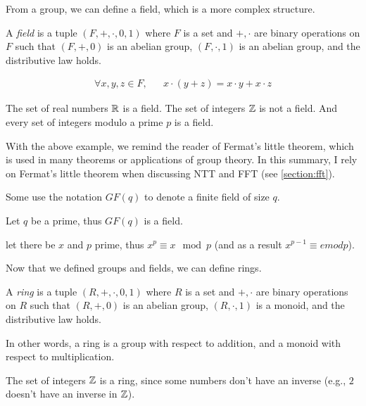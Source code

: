 From a group, we can define a field, which is a more complex structure.

\begin{defn}
    A \emph{field} is a tuple $(F,+,\cdot,0,1)$ where $F$ is a set and $+,\cdot$ are binary operations on $F$
    such that $(F,+,0)$ is an abelian group, $(F,\cdot,1)$ is an abelian group, and the distributive law holds.

    \begin{align*}
        \forall x,y,z\in F, && x\cdot(y+z) = x\cdot y + x\cdot z
    \end{align*}
\end{defn}

\begin{example}
    The set of real numbers $\mathbb{R}$ is a field. 
    The set of integers $\mathbb{Z}$ is not a field.
    And every set of integers modulo a prime $p$ is a field.
\end{example}

With the above example, we remind the reader of Fermat's little theorem, which 
is used in many theorems or applications of group theory. In this summary, I rely on Fermat's little theorem
when discussing NTT and FFT (see \autoref{section:fft}).


Some use the notation $GF(q)$ to denote a finite field of size $q$.
\begin{thm}
    Let $q$ be a prime, thus $GF(q)$ is a field.
\end{thm}

\begin{thm}\label{fermats-little-theorem}
    let there be $x$ and $p$ prime, thus $x^p \equiv x \mod p$
    (and as a result $x^{p-1}\equiv e mod p$).
\end{thm}


Now that we defined groups and fields, we can define rings.
\begin{defn}
    A \emph{ring} is a tuple $(R,+,\cdot,0,1)$ where $R$ is a set and $+,\cdot$ are binary operations on $R$
    such that $(R,+,0)$ is an abelian group, $(R,\cdot,1)$ is a monoid, and the distributive law holds.

\end{defn}

In other words, a ring is a group with respect to addition, and a monoid with respect to multiplication.

\begin{example}
    The set of integers $\mathbb{Z}$ is a ring, since some numbers don't 
    have an inverse (e.g., $2$ doesn't have an inverse in $\mathbb{Z}$). 
\end{example}



